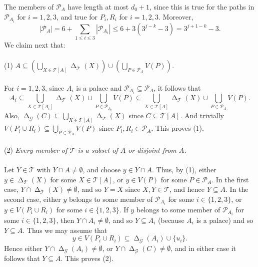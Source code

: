 \documentclass[titlepage,11pt]{article}
\newcommand{\voro}{\operatorname{\Delta}}
\newcommand{\mac}{\mathcal}
\begin{document}
	The members of $\mac P_A$ have length at most $d_0+1$, since this is true for the paths in $\mac P_{A_i}$ for $i = 1,2,3$, and true for 
	$P_i, R_i$ for $i = 1,2,3$. Moreover, 
	$$|\mac P_A|=6+\sum_{1\le i\le 3}|\mac P_{A_i}|\le 6+3(3^{j-k}-3)=3^{j+1-k}-3.$$
	We claim next that:
	\\
	\\
	(1) {\em $A\subseteq \left(\bigcup_{X\in \mac T[A]} \voro_{\mac T}(X)\right) \cup \left(\bigcup_{P\in \mac P_A}V(P)\right)$.}
	\\
	\\
	For $i =1,2,3$, since $A_i$ is a palace and $\mac P_{A_i}\subseteq \mac P_A$, it follows that 
	$$A_i\subseteq \bigcup_{X\in \mac T[A_i]} \voro_{\mac T}(X)\cup \bigcup_{P\in \mac P_{A_i}}V(P) \subseteq \bigcup_{X\in \mac T[A]} \voro_{\mac T}(X)\cup \bigcup_{P\in \mac P_A}V(P).$$
	Also, 
	$\voro_{\mac G}(C)\subseteq \bigcup_{X\in \mac T[A]} \voro_{\mac T}(X)$ since $C\subseteq \mac T[A]$. And trivially
	$V(P_i\cup R_i)\subseteq \bigcup_{P\in \mac P_A}V(P)$ since $P_i, R_i \in \mac P_A$. This proves (1).
	\\
	\\
	(2) {\em Every member of $\mac T$ is a subset of $A$ or disjoint from $A$.}
	\\
	\\
	Let $Y\in \mac T$ with $Y\cap A\ne \emptyset$, and choose $y\in Y\cap A$. Thus, by (1), either $y\in \voro_{\mac T}(X)$ for some 
	$X\in \mac T[A]$, or $y\in V(P)$ for some $P\in \mac P_A$. In the first case, $Y\cap \voro_{\mac T}(X)\ne \emptyset$, and so $Y=X$
	since $X,Y\in \mac T$, and hence $Y\subseteq A$. In the second case, either $y$ belongs to some member of
	$\mac P_{A_i}$ for some $i\in \{1,2,3\}$, or $y\in V(P_i\cup R_i)$ for some $i\in \{1,2,3\}$. If $y$ belongs to some member 
	of $\mac P_{A_i}$ for some $i\in \{1,2,3\}$, then $Y\cap A_i\ne \emptyset$, and so $Y\subseteq A_i$ (because $A_i$ is a palace)
	and so $Y\subseteq A$. Thus we may assume that 
	$$y\in V(P_i\cup R_i)\subseteq \voro_{\mac G}(A_i)\cup \{u_i\}.$$
	Hence either $Y\cap \voro_{\mac G}(A_i)\ne \emptyset$, or $Y\cap  \voro_{\mac G}(C)\ne \emptyset$, and in either case it follows that 
	$Y\subseteq A$. This proves (2).
	
	\bigskip
	
\end{document}
